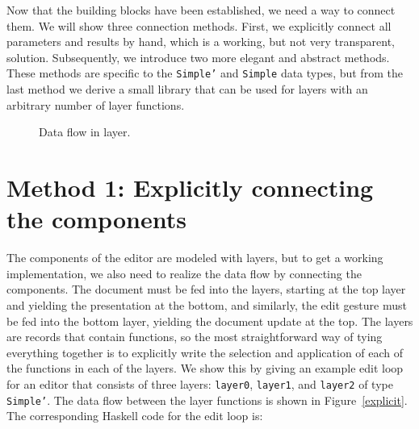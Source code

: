 Now that the building blocks have been established, we need a way to connect them. We will show three connection methods. First, we explicitly connect all parameters and results by hand, which is a working, but not very transparent, solution. Subsequently, we introduce two more elegant and abstract methods. These methods are specific to the \texttt{Simple'} and \texttt{Simple} data types, but from the last method we derive a small library that can be used for layers with an arbitrary number of layer functions. 

\begin{figure}
\begin{small}
\begin{center}
\begin{center}
\begin{scriptsize}
\end{scriptsize}
\end{center}\caption{Data flow in layer.}\label{wrapped} 
\end{center}
\end{small}
\end{figure}

%									
%									
%									
\section{Method 1: Explicitly connecting the components} \label{sectsimple}

The components of the editor are modeled with layers, but to get a working implementation, we also need to realize the data flow by connecting the components. The document must be fed into the layers, starting at the top layer and yielding the presentation at the bottom, and similarly, the edit gesture must be fed into the bottom layer, yielding the document update at the top. The layers are records that contain functions, so the most straightforward way of tying everything together is to explicitly write the selection and application of each of the functions in each of the layers. We show this by giving an example edit loop for an editor that consists of three layers: \texttt{layer0}, \texttt{layer1}, and \texttt{layer2} of type \texttt{Simple'}. The data flow between the layer functions is shown in Figure~\ref{explicit}. The corresponding Haskell code for the edit loop is:

